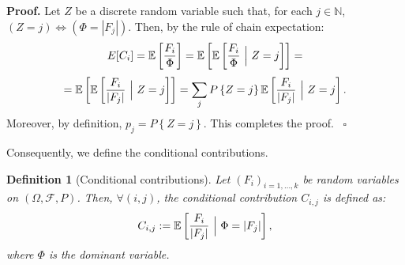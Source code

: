 \documentclass{article}
\newtheorem{definition}[theorem]{Definition}
\newenvironment{proof}[1][Proof]{\noindent\textbf{#1.} }{\ $\square$}
\begin{document}
\begin{proof}
Let $Z$ be a discrete random variable such that, for each $j\in\mathbb N$, $(Z=j) \Longleftrightarrow (\Phi=|F_j|)$. Then, by the rule of chain expectation:
$$E[C_i]=\mathbb E\left[\frac{F_i}{\Phi}\right]=\mathbb E\left[\mathbb E\left[\frac{F_i}{\Phi}\ \Big{|}\ Z=j\right]\right]=$$
$$=\mathbb E\left[\mathbb E\left[\frac{F_i}{|F_j|}\ \Big{|}\ Z=j\right]\right]=\sum_j P\left\{Z=j\right\} \mathbb E\left[\frac{F_i}{|F_j|}\ \Big{|}\ Z=j\right].$$
Moreover, by definition, $p_j=P\left\{Z=j\right\}$. This completes the proof.
\end{proof}

Consequently, we define the conditional contributions.

\begin{definition}[Conditional contributions]
Let $(F_i)_{i=1,\dots, k}$ be random variables on $(\Omega, \mathcal F, P)$. Then, $\forall (i,j)$, the conditional contribution $C_{i,j}$ is defined as:
$$C_{i,j}:=\mathbb E\left[\frac{F_i}{|F_j|}\ \Big{|}\ \Phi=|F_j|\right],$$
where $\Phi$ is the dominant variable.
\end{definition}

\newpage


\end{document}

